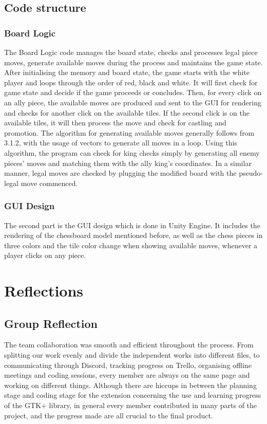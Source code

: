 \documentclass[10pt]{article}
\begin{document}
\subsection{Code structure}
\subsubsection{Board Logic}
The Board Logic code manages the board state, checks and processes legal piece moves, generate available moves during the process and maintains the game state. After initialising the memory and board state, the game starts with the white player and loops through the order of red, black and white. It will first check for game state and decide if the game proceeds or concludes. Then, for every click on an ally piece, the available moves are produced and sent to the GUI for rendering and checks for another click on the available tiles. If the second click is on the available tiles, it will then process the move and check for castling and promotion.\newline
The algorithm for generating available moves generally follows from 3.1.2, with the usage of vectors to generate all moves in a loop. Using this algorithm, the program can check for king checks simply by generating all enemy pieces' moves and matching them with the ally king's coordinates. In a similar manner, legal moves are checked by plugging the modified board with the pseudo-legal move commenced.
\subsubsection{GUI Design}
The second part is the GUI design which is done in Unity Engine. It includes the rendering of the chessboard model mentioned before, as well as the chess pieces in three colors and the tile color change when showing available moves, whenever a player clicks on any piece.
\pagebreak
\section{Reflections}
\subsection{Group Reflection}
The team collaboration was smooth and efficient throughout the process. From splitting our work evenly and divide the independent works into different files, to communicating through Discord, tracking progress on Trello, organising offline meetings and coding sessions, every member are always on the same page and working on different things. Although there are hiccups in between the planning stage and coding stage for the extension concerning the use and learning progress of the GTK+ library, in general every member contributed in many parts of the project, and the progress made are all crucial to the final product.
\end{document}
